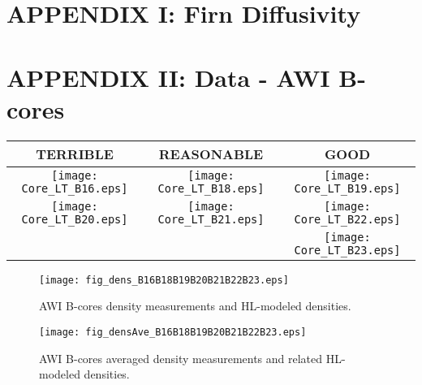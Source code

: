 \documentclass[../../CompleteThesis2/Complete_2ndDraft.tex]{subfiles}
\begin{document}
	\section[Appendix I]{APPENDIX I: Firn Diffusivity}
	\label{AppI:FirnDiffusivity}


	\newpage	
	\section[Appendix II]{APPENDIX II: Data - AWI B-cores}
	\label{AppII:Data_AWI}
	
	
	\newpage
	\begin{rotatepage}
		\begin{landscape}
			\begin{table}
				\centering
				\begin{tabular}{c||c||c}
					\textcolor{BrickRed}{\textbf{TERRIBLE}} & \textcolor{YellowOrange}{\textbf{REASONABLE}} & \textcolor{OliveGreen}{\textbf{GOOD}} \\
					\hline
					\texttt{[image: Core\_LT\_B16.eps]} & \texttt{[image: Core\_LT\_B18.eps]} & \texttt{[image: Core\_LT\_B19.eps]} \\
					\texttt{[image: Core\_LT\_B20.eps]} & \texttt{[image: Core\_LT\_B21.eps]} & \texttt{[image: Core\_LT\_B22.eps]} \\	
					& & \texttt{[image: Core\_LT\_B23.eps]} \\
				\end{tabular}
			\end{table}
		\end{landscape}
	\end{rotatepage}
	\newpage
	
	\begin{rotatepage}
		\begin{landscape}
			\begin{figure}[h]
				\centering
				\texttt{[image: fig\_dens\_B16B18B19B20B21B22B23.eps]}
				\label{fig:dens}
				\caption{AWI B-cores density measurements and HL-modeled densities.}
			\end{figure}
		\end{landscape}
	\end{rotatepage}
	\newpage
	\begin{rotatepage}
		\begin{landscape}
			\begin{figure}[h]
				\centering
				\texttt{[image: fig\_densAve\_B16B18B19B20B21B22B23.eps]}
				\label{fig:densAve}
				\caption{AWI B-cores averaged density measurements and related HL-modeled densities.}
			\end{figure}
		\end{landscape}
	\end{rotatepage}
	
\end{document}

